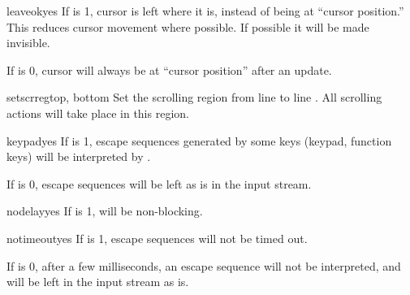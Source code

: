 \begin{methoddesc}{leaveok}{yes}
If  is 1,
cursor is left where it is, instead of being at ``cursor position.''
This reduces cursor movement where possible. If possible it will be made
invisible.

If  is 0, cursor will always be at
``cursor position'' after an update.
\end{methoddesc}

\begin{methoddesc}{setscrreg}{top, bottom}
Set the scrolling region from line  to line . All
scrolling actions will take place in this region.
\end{methoddesc}

\begin{methoddesc}{keypad}{yes}
If  is 1, escape sequences generated by some keys (keypad, 
function keys) will be interpreted by .

If  is 0, escape sequences will be left as is in the input
stream.
\end{methoddesc}

\begin{methoddesc}{nodelay}{yes}
If  is 1,  will be non-blocking.
\end{methoddesc}

\begin{methoddesc}{notimeout}{yes}
If  is 1, escape sequences will not be timed out.

If  is 0, after a few milliseconds, an escape sequence will
not be interpreted, and will be left in the input stream as is.
\end{methoddesc}
